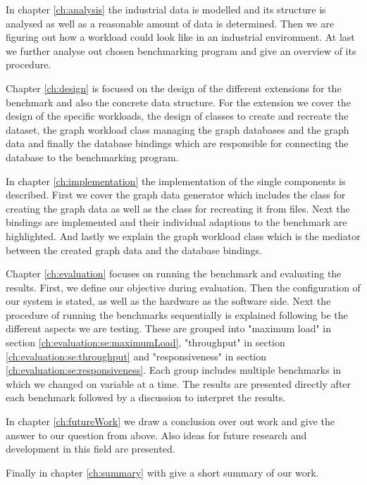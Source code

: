 In chapter \ref{ch:analysis} the industrial data is modelled and its structure is analysed as well as a reasonable amount of data is determined.
Then we are figuring out how a workload could look like in an industrial environment.
At last we further analyse out chosen benchmarking program and give an overview of its procedure.

Chapter \ref{ch:design} is focused on the design of the different extensions for the benchmark and also the concrete data structure.
For the extension we cover the design of the specific workloads,
the design of classes to create and recreate the dataset,
the graph workload class managing the graph databases and the graph data and finally the database bindings which are responsible for connecting the database to the benchmarking program.

In chapter \ref{ch:implementation} the implementation of the single components is described.
First we cover the graph data generator which includes the class for creating the graph data as well as the class for recreating it from files.
Next the bindings are implemented and their individual adaptions to the benchmark are highlighted.
And lastly we explain the graph workload class which is the mediator between the created graph data and the database bindings.

Chapter \ref{ch:evaluation} focuses on running the benchmark and evaluating the results.
First, we define our objective during evaluation.
Then the configuration of our system is stated, as well as the hardware as the software side.
Next the procedure of running the benchmarks sequentially is explained following be the different aspects we are testing.
These are grouped into "maximum load" in section \ref{ch:evaluation:se:maximumLoad}, "throughput" in section \ref{ch:evaluation:se:throughput} and "responsiveness" in section \ref{ch:evaluation:se:responsiveness}.
Each group includes multiple benchmarks in which we changed on variable at a time.
The results are presented directly after each benchmark followed by a discussion to interpret the results.

In chapter \ref{ch:futureWork} we draw a conclusion over out work and give the answer to our question from above.
Also ideas for future research and development in this field are presented.

Finally in chapter \ref{ch:summary} with give a short summary of our work.
